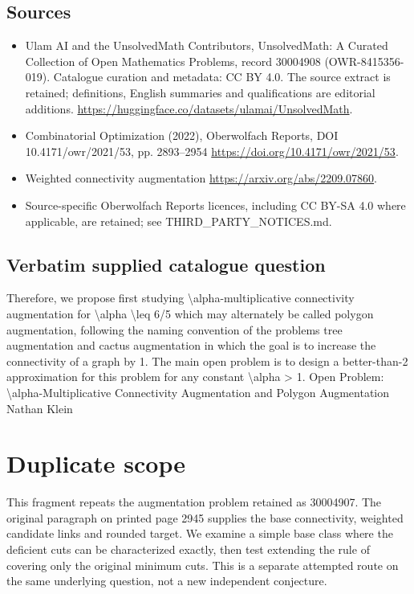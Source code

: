 \documentclass[11pt]{article}
\begin{document}
\subsection{Sources}
\begin{itemize}
\item[S1] Ulam AI and the UnsolvedMath Contributors, UnsolvedMath: A Curated Collection of Open Mathematics Problems, record 30004908 (OWR-8415356-019). Catalogue curation and metadata: CC BY 4.0. The source extract is retained; definitions, English summaries and qualifications are editorial additions.
\url{https://huggingface.co/datasets/ulamai/UnsolvedMath}.
\item[S2] Combinatorial Optimization (2022), Oberwolfach Reports, DOI 10.4171/owr/2021/53, pp. 2893--2954
\url{https://doi.org/10.4171/owr/2021/53}.
\item[S3] Weighted connectivity augmentation
\url{https://arxiv.org/abs/2209.07860}.
\item Source-specific Oberwolfach Reports licences, including CC BY-SA 4.0 where applicable, are retained; see THIRD\_PARTY\_NOTICES.md.
\end{itemize}
\subsection{Verbatim supplied catalogue question}
Therefore, we propose first studying \textbackslash{}alpha-multiplicative connectivity augmentation for \textbackslash{}alpha \textbackslash{}leq 6/5 which may alternately be called polygon augmentation, following the naming convention of the problems tree augmentation and cactus augmentation in which the goal is to increase the connectivity of a graph by 1. The main open problem is to design a better-than-2 approximation for this problem for any constant \textbackslash{}alpha > 1. Open Problem: \textbackslash{}alpha-Multiplicative Connectivity Augmentation and Polygon Augmentation Nathan Klein

\section{Duplicate scope}
This fragment repeats the augmentation problem retained as 30004907.
The original paragraph on printed page 2945 supplies the base
connectivity, weighted candidate links and rounded target. We examine
a simple base class where the deficient cuts can be characterized
exactly, then test extending the rule of covering only the original
minimum cuts. This is a separate attempted route on the same
underlying question, not a new independent conjecture.
\end{document}
